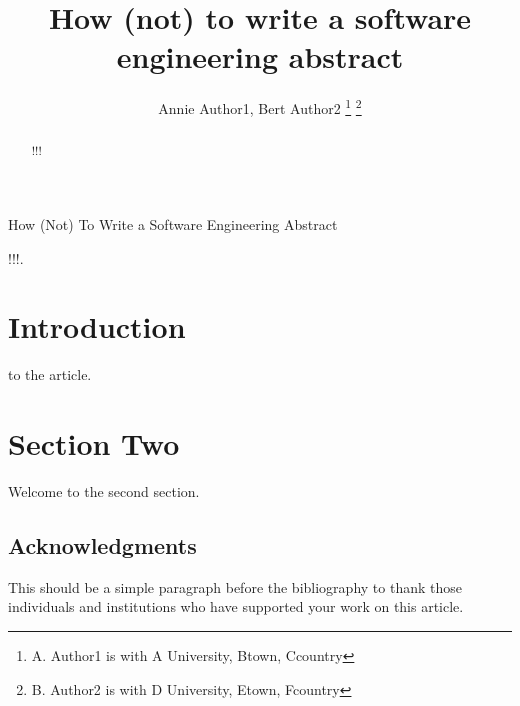 \documentclass[lettersize,journal]{IEEEtran}
\begin{document}
	
\title{How (not) to write a software engineering abstract}
\author{Annie Author1, Bert Author2
\thanks{A. Author1 is with A University, Btown, Ccountry}
\thanks{B. Author2 is with D University, Etown, Fcountry}}

%
{How (Not) To Write a Software Engineering Abstract}

\maketitle

\begin{abstract}  %
!!!
\end{abstract}

\begin{IEEEkeywords}
!!!.
\end{IEEEkeywords}


\section{Introduction}
 to the article.




\section{Section Two}

\noindent Welcome to the second section.





\subsection{Acknowledgments}
\noindent This should be a simple paragraph before the bibliography to thank those individuals and institutions who have supported your work on this article.




\end{document}
